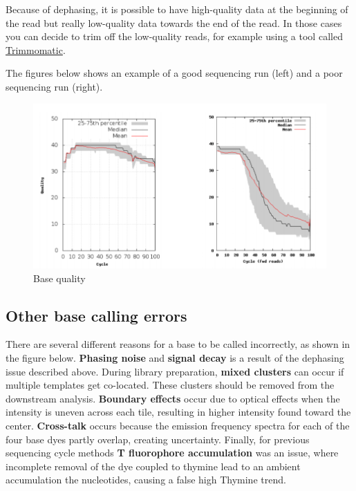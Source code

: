 \documentclass[11pt]{article}
\begin{document}
    Because of dephasing, it is possible to have high-quality data at the
beginning of the read but really low-quality data towards the end of the
read. In those cases you can decide to trim off the low-quality reads,
for example using a tool called
\href{http://www.usadellab.org/cms/?page=trimmomatic}{Trimmomatic}.

The figures below shows an example of a good sequencing run (left) and a
poor sequencing run (right).

    \begin{figure}[!h]
\centering
\includegraphics{img/base_qual_comparison.png}
\caption{Base quality}
\end{figure}

    \hypertarget{other-base-calling-errors}{%
\subsection{Other base calling errors}\label{other-base-calling-errors}}

There are several different reasons for a base to be called incorrectly,
as shown in the figure below. \textbf{Phasing noise} and \textbf{signal
decay} is a result of the dephasing issue described above. During
library preparation, \textbf{mixed clusters} can occur if multiple
templates get co-located. These clusters should be removed from the
downstream analysis. \textbf{Boundary effects} occur due to optical
effects when the intensity is uneven across each tile, resulting in
higher intensity found toward the center. \textbf{Cross-talk} occurs
because the emission frequency spectra for each of the four base dyes
partly overlap, creating uncertainty. Finally, for previous sequencing
cycle methods \textbf{T fluorophore accumulation} was an issue, where
incomplete removal of the dye coupled to thymine lead to an ambient
accumulation the nucleotides, causing a false high Thymine trend.
\end{document}
